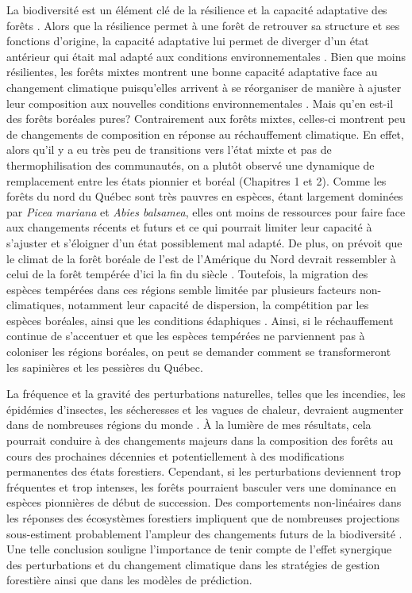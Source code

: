 La biodiversité est un élément clé de la résilience et la capacité
adaptative des forêts
\citep{messier_functional_2019, filotas_viewing_2014}. Alors que la
résilience permet à une forêt de retrouver sa structure et ses fonctions
d'origine, la capacité adaptative lui permet de diverger d'un état
antérieur qui était mal adapté aux conditions environnementales
\citep{messier_managing_2013, filotas_viewing_2014}. Bien que moins
résilientes, les forêts mixtes montrent une bonne capacité adaptative
face au changement climatique puisqu'elles arrivent à se réorganiser de
manière à ajuster leur composition aux nouvelles conditions
environnementales \citep{messier_functional_2019, filotas_viewing_2014}.
Mais qu'en est-il des forêts boréales pures? Contrairement aux forêts
mixtes, celles-ci montrent peu de changements de composition en réponse
au réchauffement climatique. En effet, alors qu'il y a eu très peu de
transitions vers l'état mixte et pas de thermophilisation des
communautés, on a plutôt observé une dynamique de remplacement entre les
états pionnier et boréal (Chapitres 1 et 2). Comme les forêts du nord du
Québec sont très pauvres en espèces, étant largement dominées par
\emph{Picea mariana} et \emph{Abies balsamea}, elles ont moins de
ressources pour faire face aux changements récents et futurs et ce qui
pourrait limiter leur capacité à s'ajuster et s'éloigner d'un état
possiblement mal adapté. De plus, on prévoit que le climat de la forêt
boréale de l'est de l'Amérique du Nord devrait ressembler à celui de la
forêt tempérée d'ici la fin du siècle \citep{gauthier_boreal_2015}.
Toutefois, la migration des espèces tempérées dans ces régions semble
limitée par plusieurs facteurs non-climatiques, notamment leur capacité
de dispersion, la compétition par les espèces boréales, ainsi que les
conditions édaphiques \citep[Chapitre
3;][]{solarik_priority_2019, carteron_soil_2020}. Ainsi, si le
réchauffement continue de s'accentuer et que les espèces tempérées ne
parviennent pas à coloniser les régions boréales, on peut se demander
comment se transformeront les sapinières et les pessières du Québec.

La fréquence et la gravité des perturbations naturelles, telles que les
incendies, les épidémies d'insectes, les sécheresses et les vagues de
chaleur, devraient augmenter dans de nombreuses régions du monde
\citep{seidl_forest_2017, bergeron_past_2006}. À la lumière de mes
résultats, cela pourrait conduire à des changements majeurs dans la
composition des forêts au cours des prochaines décennies et
potentiellement à des modifications permanentes des états forestiers.
Cependant, si les perturbations deviennent trop fréquentes et trop
intenses, les forêts pourraient basculer vers une dominance en espèces
pionnières de début de succession. Des comportements non-linéaires dans
les réponses des écosystèmes forestiers impliquent que de nombreuses
projections sous-estiment probablement l'ampleur des changements futurs
de la biodiversité \citep{scheffer_catastrophic_2001}. Une telle
conclusion souligne l'importance de tenir compte de l'effet synergique
des perturbations et du changement climatique dans les stratégies de
gestion forestière ainsi que dans les modèles de prédiction.


